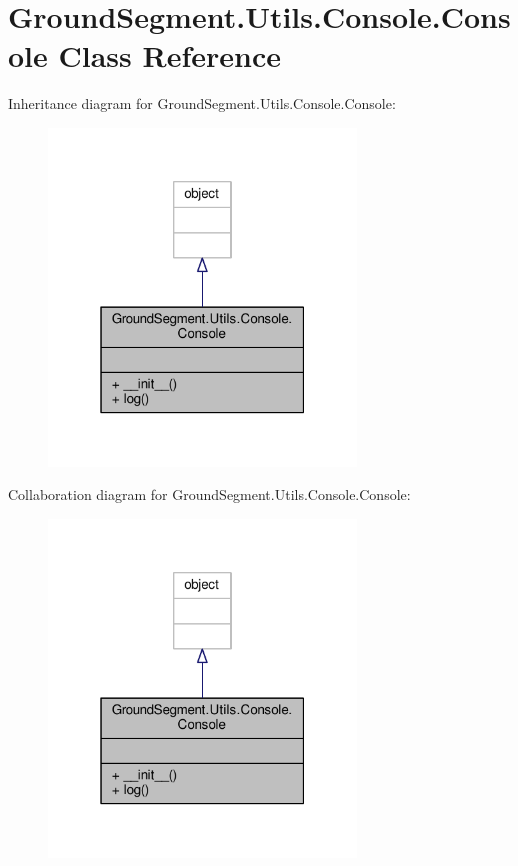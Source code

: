 \hypertarget{class_ground_segment_1_1_utils_1_1_console_1_1_console}{}\section{Ground\+Segment.\+Utils.\+Console.\+Console Class Reference}
\label{class_ground_segment_1_1_utils_1_1_console_1_1_console}


Inheritance diagram for Ground\+Segment.\+Utils.\+Console.\+Console\+:\nopagebreak
\begin{figure}[H]
\begin{center}
\leavevmode
\includegraphics[width=232pt]{class_ground_segment_1_1_utils_1_1_console_1_1_console__inherit__graph}
\end{center}
\end{figure}


Collaboration diagram for Ground\+Segment.\+Utils.\+Console.\+Console\+:\nopagebreak
\begin{figure}[H]
\begin{center}
\leavevmode
\includegraphics[width=232pt]{class_ground_segment_1_1_utils_1_1_console_1_1_console__coll__graph}
\end{center}
\end{figure}
